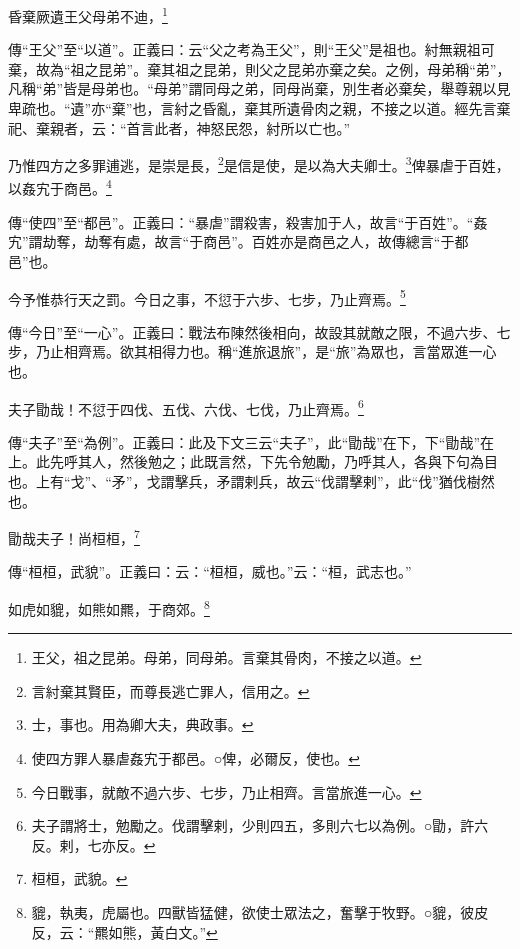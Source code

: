 昏棄厥遺王父母弟不迪，\footnote{王父，祖之昆弟。母弟，同母弟。言棄其骨肉，不接之以道。}

{\noindent\zhuan{}\fzbyks 傳“王父”至“以道”。正義曰：云“父之考為王父”，則“王父”是祖也。紂無親祖可棄，故為“祖之昆弟”。棄其祖之昆弟，則父之昆弟亦棄之矣。之例，母弟稱“弟”，凡稱“弟”皆是母弟也。“母弟”謂同母之弟，同母尚棄，別生者必棄矣，舉尊親以見卑疏也。“遺”亦“棄”也，言紂之昏亂，棄其所遺骨肉之親，不接之以道。經先言棄祀、棄親者，云：“首言此者，神怒民怨，紂所以亡也。” \par}

乃惟四方之多罪逋逃，是崇是長，\footnote{言紂棄其賢臣，而尊長逃亡罪人，信用之。}是信是使，是以為大夫卿士。\footnote{士，事也。用為卿大夫，典政事。}俾暴虐于百姓，以姦宄于商邑。\footnote{使四方罪人暴虐姦宄于都邑。○俾，必爾反，使也。}

{\noindent\zhuan{}\fzbyks 傳“使四”至“都邑”。正義曰：“暴虐”謂殺害，殺害加于人，故言“于百姓”。“姦宄”謂劫奪，劫奪有處，故言“于商邑”。百姓亦是商邑之人，故傳總言“于都邑”也。 \par}

今予惟恭行天之罰。今日之事，不愆于六步、七步，乃止齊焉。\footnote{今日戰事，就敵不過六步、七步，乃止相齊。言當旅進一心。}

{\noindent\zhuan{}\fzbyks 傳“今日”至“一心”。正義曰：戰法布陳然後相向，故設其就敵之限，不過六步、七步，乃止相齊焉。欲其相得力也。稱“進旅退旅”，是“旅”為眾也，言當眾進一心也。 \par}

夫子勖哉！不愆于四伐、五伐、六伐、七伐，乃止齊焉。\footnote{夫子謂將士，勉勵之。伐謂擊剌，少則四五，多則六七以為例。○勖，許六反。剌，七亦反。}

{\noindent\zhuan{}\fzbyks 傳“夫子”至“為例”。正義曰：此及下文三云“夫子”，此“勖哉”在下，下“勖哉”在上。此先呼其人，然後勉之；此既言然，下先令勉勵，乃呼其人，各與下句為目也。上有“戈”、“矛”，戈謂擊兵，矛謂剌兵，故云“伐謂擊剌”，此“伐”猶伐樹然也。 \par}

勖哉夫子！尚桓桓，\footnote{桓桓，武貌。}

{\noindent\zhuan{}\fzbyks 傳“桓桓，武貌”。正義曰：云：“桓桓，威也。”云：“桓，武志也。” \par}

如虎如貔，如熊如羆，于商郊。\footnote{貔，執夷，虎屬也。四獸皆猛健，欲使士眾法之，奮擊于牧野。○貔，彼皮反，云：“羆如熊，黃白文。”}

